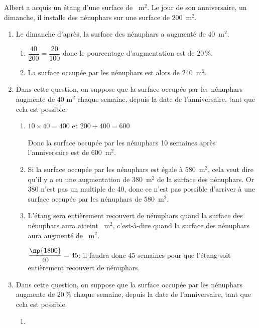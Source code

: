 \medskip

Albert a acquis un étang d'une surface de ~m$^2$.
Le jour de son anniversaire, un dimanche, il installe des nénuphars sur une surface de $200$~m$^2$.



\begin{enumerate}
\item Le dimanche d'après, la surface des nénuphars a augmenté de $40$~m$^2$.
	\begin{enumerate}
		\item 
$\dfrac{40}{200}=\dfrac{20}{100}$ donc le pourcentage d'augmentation est de 20\,\%.		
				\item La surface occupée par les nénuphars est alors de 240~m$^2$.
	\end{enumerate}














\item Dans cette question, on suppose que la surface occupée par les nénuphars augmente de $40$ m$^2$ chaque semaine, depuis la date de l'anniversaire, tant que cela est possible.
	\begin{enumerate}
		\item $10\times 40=400$ et $200+400=600$
		
Donc la surface occupée par les nénuphars 10 semaines après l'anniversaire est de 600~m$^2$.
		\item 
Si  la surface occupée par les nénuphars est égale à $580$~m$^2$, cela veut dire qu'il y a eu une augmentation de 380~m$^2$ de la surface des nénuphars. Or 380 n'est pas un multiple de 40, donc ce n'est pas possible d'arriver à une surface occupée par les nénuphars de 580~m$^2$.
		
		\item
L'étang sera  entièrement recouvert de nénuphars quand la surface des nénuphars aura atteint ~m$^2$, c'est-à-dire quand la surface des nénuphars aura augmenté de ~m$^2$.

$\dfrac{\np{1800}}{40}=45$; il faudra donc 45 semaines pour que l'étang soit entièrement recouvert de nénuphars.
		
		
	\end{enumerate}
\item Dans cette question, on suppose que la surface occupée par les nénuphars augmente de $20\,\%$ chaque semaine, depuis la date de l'anniversaire, tant que cela est possible.
	\begin{enumerate}
		\item 
{}		
		

\end{enumerate}
\end{enumerate}

